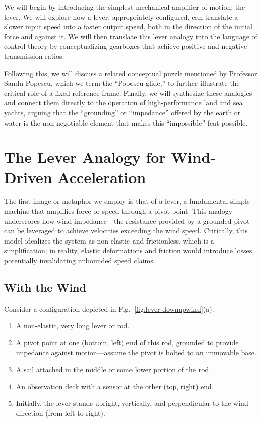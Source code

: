 \documentclass[reprint,aps,pra,superscriptaddress,longbibliography]{revtex4-2}
\begin{document}
We will begin by introducing the simplest mechanical amplifier of motion: the lever. We will explore how a lever, appropriately configured, can translate a slower input speed into a faster output speed, both in the direction of the initial force and against it. We will then translate this lever analogy into the language of control theory by conceptualizing gearboxes that achieve positive and negative transmission ratios.

Following this, we will discuss a related conceptual puzzle mentioned by Professor Sandu Popescu, which we term the ``Popescu glide,'' to further illustrate the critical role of a fixed reference frame. Finally, we will synthesize these analogies and connect them directly to the operation of high-performance land and sea yachts, arguing that the ``grounding'' or ``impedance'' offered by the earth or water is the non-negotiable element that makes this ``impossible'' feat possible.

\section{The Lever Analogy for Wind-Driven Acceleration}

The first image or metaphor we employ is that of a lever, a fundamental simple machine that amplifies force or speed through a pivot point. This analogy underscores how wind impedance---the resistance provided by a grounded pivot---can be leveraged to achieve velocities exceeding the wind speed. Critically, this model idealizes the system as non-elastic and frictionless, which is a simplification; in reality, elastic deformations and friction would introduce losses, potentially invalidating unbounded speed claims.

\subsection{With the Wind}

Consider a configuration depicted in Fig.~\ref{fig:lever-downupwind}(a):
\begin{enumerate}
    \item  A non-elastic, very long lever or rod.
    \item A pivot point at one (bottom, left) end of this rod, grounded to provide impedance against motion---assume the pivot is bolted to an immovable base.
    \item A sail attached in the middle or some lower portion of the rod.
    \item An observation deck with a sensor at the other (top, right) end.
    \item Initially, the lever stands upright, vertically, and perpendicular to the wind direction (from left to right).
\end{enumerate}
\end{document}
